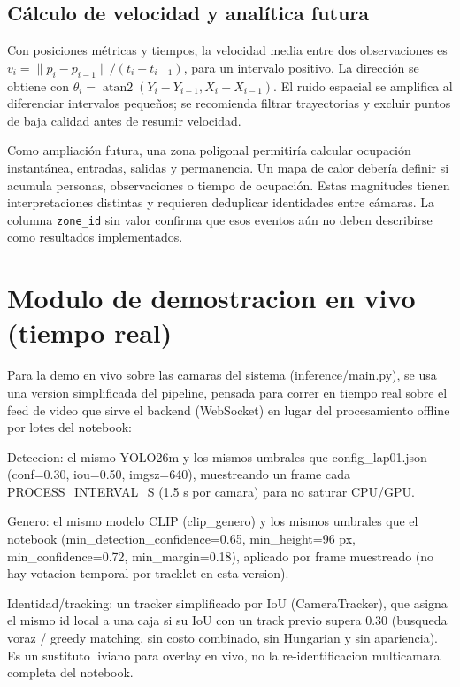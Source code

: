\documentclass[12pt,letterpaper]{article}
\begin{document}
\subsection{Cálculo de velocidad y analítica futura}
Con posiciones métricas y tiempos, la velocidad media entre dos observaciones es $v_i=\|p_i-p_{i-1}\|/(t_i-t_{i-1})$, para un intervalo positivo. La dirección se obtiene con $\theta_i=\operatorname{atan2}(Y_i-Y_{i-1},X_i-X_{i-1})$. El ruido espacial se amplifica al diferenciar intervalos pequeños; se recomienda filtrar trayectorias y excluir puntos de baja calidad antes de resumir velocidad.

Como ampliación futura, una zona poligonal permitiría calcular ocupación instantánea, entradas, salidas y permanencia. Un mapa de calor debería definir si acumula personas, observaciones o tiempo de ocupación. Estas magnitudes tienen interpretaciones distintas y requieren deduplicar identidades entre cámaras. La columna \texttt{zone\_\allowbreak id} sin valor confirma que esos eventos aún no deben describirse como resultados implementados.

\section{Modulo de demostracion en vivo (tiempo real)}

Para la demo en vivo sobre las camaras del sistema (inference/main.py), se usa una version simplificada del pipeline, pensada para correr en tiempo real sobre el feed de video que sirve el backend (WebSocket) en lugar del procesamiento offline por lotes del notebook:


Deteccion: el mismo YOLO26m y los mismos umbrales que config\_\allowbreak lap01.json (conf=0.30, iou=0.50, imgsz=640), muestreando un frame cada PROCESS\_\allowbreak INTERVAL\_\allowbreak S (1.5 s por camara) para no saturar CPU/GPU.


Genero: el mismo modelo CLIP (clip\_\allowbreak genero) y los mismos umbrales que el notebook (min\_\allowbreak detection\_\allowbreak confidence=0.65, min\_\allowbreak height=96 px, min\_\allowbreak confidence=0.72, min\_\allowbreak margin=0.18), aplicado por frame muestreado (no hay votacion temporal por tracklet en esta version).


Identidad/tracking: un tracker simplificado por IoU (CameraTracker), que asigna el mismo id local a una caja si su IoU con un track previo supera 0.30 (busqueda voraz / greedy matching, sin costo combinado, sin Hungarian y sin apariencia). Es un sustituto liviano para overlay en vivo, no la re-identificacion multicamara completa del notebook.
\end{document}
